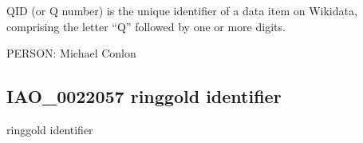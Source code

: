 \documentclass[letterpaper,10pt,english]{sphinxmanual}
\begin{document}
\begin{sphinxShadowBox}

\sphinxAtStartPar
{\hyperref[\detokenize{doc-IAO_0000578::doc}]{}}
\end{sphinxShadowBox}

\begin{sphinxShadowBox}

\sphinxAtStartPar
QID (or Q number) is the unique identifier of a data item on Wikidata, comprising the letter “Q” followed by one or more digits.
\end{sphinxShadowBox}

\begin{sphinxShadowBox}

\sphinxAtStartPar
{}
\end{sphinxShadowBox}

\begin{sphinxShadowBox}

\sphinxAtStartPar
{}
\end{sphinxShadowBox}

\begin{sphinxShadowBox}

\sphinxAtStartPar
PERSON: Michael Conlon
\end{sphinxShadowBox}
\begin{quote}

\ignorespaces \end{quote}


\subsection{IAO\_0022057 \sphinxhyphen{} ringgold identifier}
\label{\detokenize{doc-IAO_0022057:iao-0022057-ringgold-identifier}}\label{\detokenize{doc-IAO_0022057:index-0}}\label{\detokenize{doc-IAO_0022057::doc}}
\begin{sphinxShadowBox}

\sphinxAtStartPar
ringgold identifier
\end{sphinxShadowBox}
\end{document}
